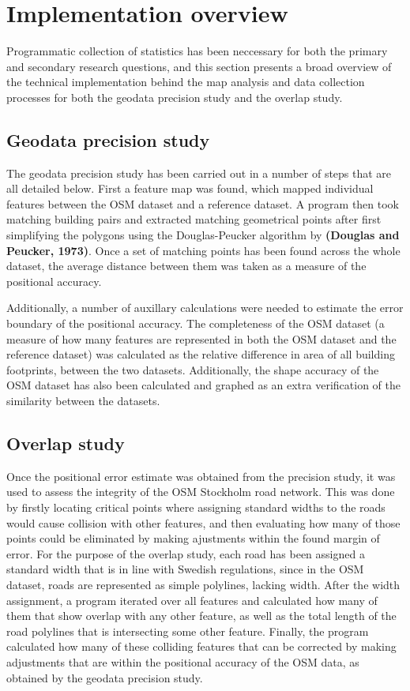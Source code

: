\documentclass{kththesis}
\begin{document}
\section{Implementation overview}

Programmatic collection of statistics has been neccessary for both the primary and secondary research questions, and this section presents a broad overview of the technical implementation behind the map analysis and data collection processes for both the geodata precision study and the overlap study.

\subsection{Geodata precision study}

The geodata precision study has been carried out in a number of steps that are all detailed below.
First a feature map was found, which mapped individual features between the OSM dataset and a reference dataset.
A program then took matching building pairs and extracted matching geometrical points after first simplifying the polygons using the Douglas-Peucker algorithm by \textbf{(Douglas and Peucker, 1973)}.
Once a set of matching points has been found across the whole dataset, the average distance between them was taken as a measure of the positional accuracy.

Additionally, a number of auxillary calculations were needed to estimate the error boundary of the positional accuracy.
The completeness of the OSM dataset (a measure of how many features are represented in both the OSM dataset and the reference dataset) was calculated as the relative difference in area of all building footprints, between the two datasets.
Additionally, the shape accuracy of the OSM dataset has also been calculated and graphed as an extra verification of the similarity between the datasets.

\subsection{Overlap study}

Once the positional error estimate was obtained from the precision study, it was used to assess the integrity of the OSM Stockholm road network.
This was done by firstly locating critical points where assigning standard widths to the roads would cause collision with other features, and then evaluating how many of those points could be eliminated by making ajustments within the found margin of error.
For the purpose of the overlap study, each road has been assigned a standard width that is in line with Swedish regulations, since in the OSM dataset, roads are represented as simple polylines, lacking width.
After the width assignment, a program iterated over all features and calculated how many of them that show overlap with any other feature, as well as the total length of the road polylines that is intersecting some other feature.
Finally, the program calculated how many of these colliding features that can be corrected by making adjustments that are within the positional accuracy of the OSM data, as obtained by the geodata precision study.
\end{document}
